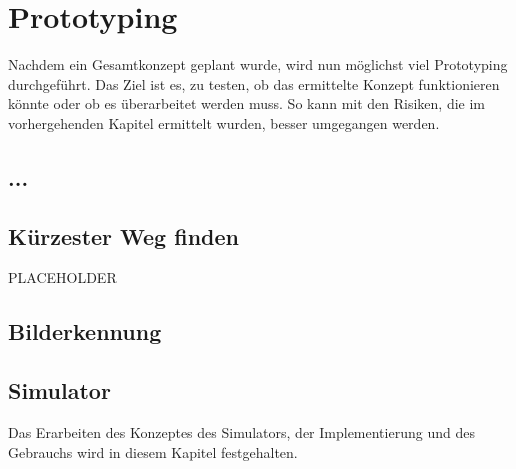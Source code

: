 \section{Prototyping}

Nachdem ein Gesamtkonzept geplant wurde, wird nun möglichst viel Prototyping durchgeführt. Das Ziel ist es, zu testen, ob das ermittelte Konzept funktionieren könnte oder ob es überarbeitet werden muss. So kann mit den Risiken, die im vorhergehenden Kapitel ermittelt wurden, besser umgegangen werden.

\subsection{...}

\subsection{Kürzester Weg finden}

PLACEHOLDER

\subsection{Bilderkennung}

\subsection{Simulator}

Das Erarbeiten des Konzeptes des Simulators, der Implementierung und des Gebrauchs wird in diesem Kapitel festgehalten.
